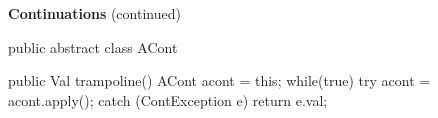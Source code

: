 \begin{minipage}[t]{\sw}
\slidenumber
\LARGE
{\bf Continuations} (continued)
\begin{qv}
public abstract class ACont {

    public Val trampoline() {
        ACont acont = this;
        while(true)
            try {
                acont = acont.apply();
            } catch (ContException e) {
                return e.val;
            }
    }

}
\end{qv}
\end{minipage}

